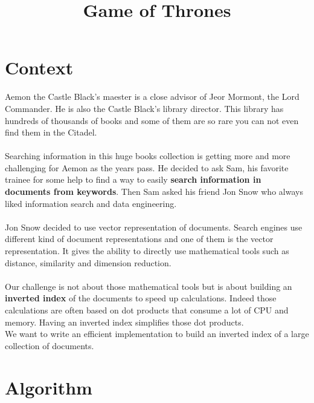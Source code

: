 \documentclass[12pt,french,titlepage]{article}
\title{\textbf{Game of Thrones}}
\date{\vspace{-35ex}}
\begin{document}
\maketitle

\section{Context}
Aemon the Castle Black's maester is a close advisor of Jeor Mormont, the Lord Commander. He is also the Castle Black's library director. This library has hundreds of thousands of books and some of them are so rare you can not even find them in the Citadel. 
\\\\
Searching information in this huge books collection is getting more and more challenging for Aemon as the years pass. He decided to ask Sam, his favorite trainee for some help to find a way to easily \textbf{search information in documents from keywords}. Then Sam asked his friend Jon Snow who always liked information search and data engineering.
\\\\
Jon Snow decided to use vector representation of documents. Search engines use different kind of document representations and one of them is the vector representation. It gives the ability to directly use mathematical tools such as distance, similarity and dimension reduction.
\\\\
Our challenge is not about those mathematical tools but is about building an \textbf{inverted index} of the documents to speed up calculations. Indeed those calculations are often based on dot products that consume a lot of CPU and memory. Having an inverted index simplifies those dot products.
\\
We want to write an efficient implementation to build an inverted index of a large collection of documents.

\section{Algorithm}
\end{document}
